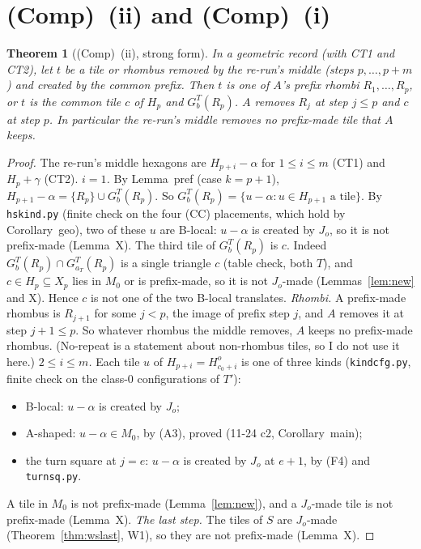 \documentclass[11pt]{article}
\newtheorem{theorem}{Theorem}\newtheorem{lemma}[theorem]{Lemma}\newtheorem{proposition}[theorem]{Proposition}
\theoremstyle{definition}\newtheorem{definition}[theorem]{Definition}\newtheorem{remark}[theorem]{Remark}
\begin{document}
\section{(Comp)~(ii) and (Comp)~(i)}\label{sec:comp}
\begin{theorem}[(Comp)~(ii), strong form]\label{thm:comp2}
In a geometric record (with CT1 and CT2), let $t$ be a tile or rhombus removed by the re-run's middle (steps $p,\dots,p+m$) and created by the common prefix. Then $t$ is one of $A$'s prefix rhombi $R_1,\dots,R_p$, or $t$ is the common tile $c$ of $H_p$ and $G^T_b(R_p)$. $A$ removes $R_j$ at step $j\le p$ and $c$ at step $p$. In particular the re-run's middle removes no prefix-made tile that $A$ keeps.
\end{theorem}
\begin{proof}
The re-run's middle hexagons are $H_{p+i}-\alpha$ for $1\le i\le m$ (CT1) and $H_p+\gamma$ (CT2).
\emph{$i=1$.} By Lemma~pref (case $k=p+1$), $H_{p+1}-\alpha=\{R_p\}\cup G^T_b(R_p)$. So $G^T_b(R_p)=\{u-\alpha:u\in H_{p+1}\text{ a tile}\}$. By \texttt{hskind.py} (finite check on the four (CC) placements, which hold by Corollary~geo), two of these $u$ are B-local: $u-\alpha$ is created by $J_o$, so it is not prefix-made (Lemma~X). The third tile of $G^T_b(R_p)$ is $c$. Indeed $G^T_b(R_p)\cap G^T_{a_T}(R_p)$ is a single triangle $c$ (table check, both $T$), and $c\in H_p\subseteq X_p$ lies in $M_0$ or is prefix-made, so it is not $J_o$-made (Lemmas~\ref{lem:new} and X). Hence $c$ is not one of the two B-local translates.
\emph{Rhombi.} A prefix-made rhombus is $R_{j+1}$ for some $j<p$, the image of prefix step $j$, and $A$ removes it at step $j+1\le p$. So whatever rhombus the middle removes, $A$ keeps no prefix-made rhombus. (No-repeat is a statement about non-rhombus tiles, so I do not use it here.)
\emph{$2\le i\le m$.} Each tile $u$ of $H_{p+i}=H^o_{c_0+i}$ is one of three kinds (\texttt{kindcfg.py}, finite check on the class-0 configurations of $T'$):
\begin{itemize}
\item B-local: $u-\alpha$ is created by $J_o$;
\item A-shaped: $u-\alpha\in M_0$, by (A3), proved (11-24 c2, Corollary~main);
\item the turn square at $j=e$: $u-\alpha$ is created by $J_o$ at $e+1$, by (F4) and \texttt{turnsq.py}.
\end{itemize}
A tile in $M_0$ is not prefix-made (Lemma~\ref{lem:new}), and a $J_o$-made tile is not prefix-made (Lemma~X).
\emph{The last step.} The tiles of $S$ are $J_o$-made (Theorem~\ref{thm:wslast}, W1), so they are not prefix-made (Lemma~X).
\end{proof}
\end{document}
